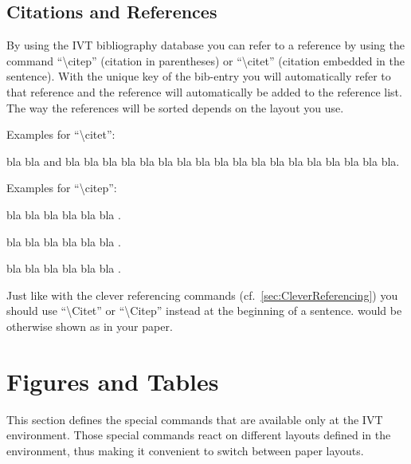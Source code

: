 \documentclass[numbered]{ivt-style/standard}\usepackage[]{graphicx}\usepackage[]{xcolor}
\begin{document}
\subsection{Citations and References}

By using the IVT bibliography database you can refer to a reference by
using the command ``\textbackslash{}citep'' (citation in parentheses)
or ``\textbackslash{}citet''
(citation embedded in the sentence). With the unique key of the
bib-entry you will automatically refer to that reference and the
reference will automatically be added to the reference list. The way
the references will be sorted depends on the layout you use.

Examples for ``\textbackslash{}citet'':

bla bla \citet{axhausen2008income} and
\citet{matsimbook}
bla bla bla bla bla bla bla bla bla bla
\citet{axhausen2008income,matsimbook}
bla bla bla bla bla bla bla bla.

Examples for ``\textbackslash{}citep'':

bla bla bla bla bla bla
\citep[e.g.,]{matsimbook,axhausen2008income}.

bla bla bla bla bla bla \citep[see also][pp.325-378]{axhausen2008income}.

bla bla bla bla bla bla \citep{axhausen2008income}.

Just like with the clever referencing commands (cf.~\cref{sec:CleverReferencing})
you should use ``\textbackslash{}Citet'' or ``\textbackslash{}Citep'' instead
at the beginning of a sentence.
would be otherwise shown as \citet{axhausen2008income}
in your paper.





%
\section{Figures and Tables}
%

This section defines the
special commands that are available only at the IVT environment.
Those special commands
react on different layouts defined in the environment,
thus making it convenient to switch between paper layouts.
\end{document}

